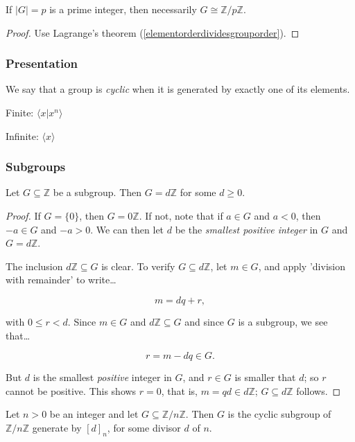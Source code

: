 \begin{proposition}
If $|G| = p$ is a prime integer, then necessarily $G \cong \mathbb{Z} / p \mathbb{Z}$.
\end{proposition}

\begin{proof}
Use Lagrange's theorem (\ref{elementorderdividesgrouporder}).
\end{proof}

\subsubsection{Presentation}
We say that a group is \emph{cyclic} when it is generated by exactly one of its elements.

\noindent Finite: $\langle x | x^n \rangle$\newline

\noindent Infinite: $\langle x \rangle$

\subsubsection{Subgroups}

\begin{proposition}
Let $G \subseteq \mathbb{Z}$ be a subgroup. Then $G = d\mathbb{Z}$ for some $d \geq 0$.
\end{proposition}

\begin{proof}
If $G = \{ 0 \}$, then $G = 0\mathbb{Z}$. If not, note that if $a \in G$ and $a < 0$, then $-a \in G$ and $-a > 0$.
We can then let $d$ be the \emph{smallest positive integer} in $G$ and $G = d\mathbb{Z}$.

The inclusion $d\mathbb{Z} \subseteq G$ is clear. To verify $G \subseteq d\mathbb{Z}$, let $m \in G$, and apply 'division with remainder'
to write\dots

$$m = dq + r,$$

with $0 \leq r < d$. Since $m \in G$ and $d\mathbb{Z} \subseteq G$ and since $G$ is a subgroup, we see that\dots

$$r = m - dq \in G.$$

But $d$ is the smallest \emph{positive} integer in $G$, and $r \in G$ is smaller that $d$; so $r$ cannot be positive. This shows $r = 0$, that is,
$m = qd \in d\mathbb{Z}$; $G \subseteq d\mathbb{Z}$ follows.
\end{proof}

\begin{proposition}
\label{infinitecyclicsubgroup}
Let $n > 0$ be an integer and let $G \subseteq \mathbb{Z}/n\mathbb{Z}$. Then $G$ is the cyclic subgroup of $\mathbb{Z}/n\mathbb{Z}$ generate by $[d]_n$,
for some divisor $d$ of $n$.
\end{proposition}

